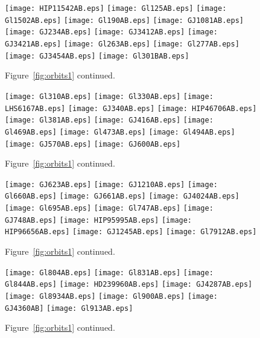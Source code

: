 \documentclass[twocolumn]{aastex62}
\begin{document}
\begin{figure}[htp]
\begin{center}
\texttt{[image: HIP11542AB.eps]} %
\texttt{[image: Gl125AB.eps]}
\texttt{[image: Gl1502AB.eps]}
\texttt{[image: Gl190AB.eps]}
\texttt{[image: GJ1081AB.eps]}
\texttt{[image: GJ234AB.eps]}
\texttt{[image: GJ3412AB.eps]}
\texttt{[image: GJ3421AB.eps]}
\texttt{[image: Gl263AB.eps]}
\texttt{[image: Gl277AB.eps]}
\texttt{[image: GJ3454AB.eps]}
\texttt{[image: Gl301BAB.eps]}
\caption{Figure~\ref{fig:orbits1} continued.}
\label{fig:orbits2}
\end{center}
\end{figure}


\begin{figure}[htp]
\begin{center}
\texttt{[image: Gl310AB.eps]}
\texttt{[image: Gl330AB.eps]}
\texttt{[image: LHS6167AB.eps]}
\texttt{[image: GJ340AB.eps]}
\texttt{[image: HIP46706AB.eps]}%
\texttt{[image: Gl381AB.eps]}
\texttt{[image: GJ416AB.eps]}
\texttt{[image: Gl469AB.eps]}
\texttt{[image: Gl473AB.eps]}
\texttt{[image: Gl494AB.eps]}
\texttt{[image: GJ570AB.eps]}
\texttt{[image: GJ600AB.eps]}
\caption{Figure~\ref{fig:orbits1} continued.}
\label{fig:orbits3}
\end{center}
\end{figure}

\begin{figure}[htp]
\begin{center}
\texttt{[image: GJ623AB.eps]}
\texttt{[image: GJ1210AB.eps]}
\texttt{[image: Gl660AB.eps]}
\texttt{[image: GJ661AB.eps]}
\texttt{[image: GJ4024AB.eps]}
\texttt{[image: Gl695AB.eps]}
\texttt{[image: Gl747AB.eps]}
\texttt{[image: GJ748AB.eps]}
\texttt{[image: HIP95995AB.eps]}
\texttt{[image: HIP96656AB.eps]}
\texttt{[image: GJ1245AB.eps]}
\texttt{[image: Gl7912AB.eps]}
\caption{Figure~\ref{fig:orbits1} continued.}
\label{fig:orbits4}
\end{center}
\end{figure}


\begin{figure}[htp]
\begin{center}
\texttt{[image: Gl804AB.eps]}
\texttt{[image: Gl831AB.eps]}
\texttt{[image: Gl844AB.eps]}
\texttt{[image: HD239960AB.eps]} 
\texttt{[image: GJ4287AB.eps]}
\texttt{[image: Gl8934AB.eps]}
\texttt{[image: Gl900AB.eps]}
\texttt{[image: GJ4360AB]}
\texttt{[image: Gl913AB.eps]}
\caption{Figure~\ref{fig:orbits1} continued.}
\label{fig:orbits5}
\end{center}
\end{figure}
\end{document}
